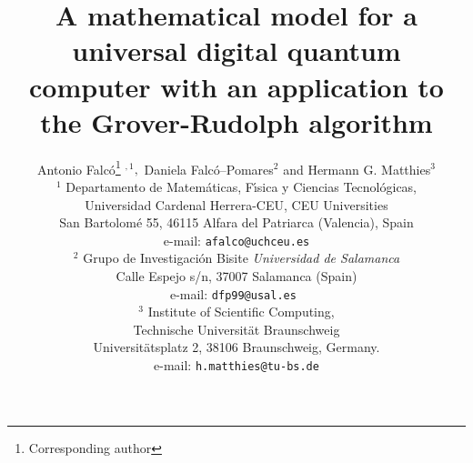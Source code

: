 \documentclass[a4paper,11pt]{article}
\begin{document}
\title{A mathematical model for a universal digital quantum computer with an application to the Grover-Rudolph algorithm}
\author{Antonio Falc\'{o}\footnote{Corresponding author}$^{\, \, \,,1},$ Daniela Falc\'{o}--Pomares$^{2}$ and Hermann G. Matthies$%
^{3}$ \\
$^{1}$ Departamento de Matem\'aticas, F\'{\i}sica y Ciencias
Tecnol\'ogicas,\\
Universidad Cardenal Herrera-CEU, CEU Universities \\
San Bartolom\'e 55,
46115 Alfara del Patriarca (Valencia), Spain\\
e-mail: \texttt{afalco@uchceu.es}\\
$^{2}$ Grupo de Investigaci\'on Bisite \emph{Universidad de Salamanca}\\
Calle Espejo s/n, 37007 Salamanca (Spain)   \\
e-mail: \texttt{{dfp99@usal.es} }\\
$^{3}$ Institute of Scientific Computing, \\
Technische Universität Braunschweig\\
Universitätsplatz 2, 38106 Braunschweig, Germany.\\
e-mail: \texttt{h.matthies@tu-bs.de}}
\date{}



\end{document}
